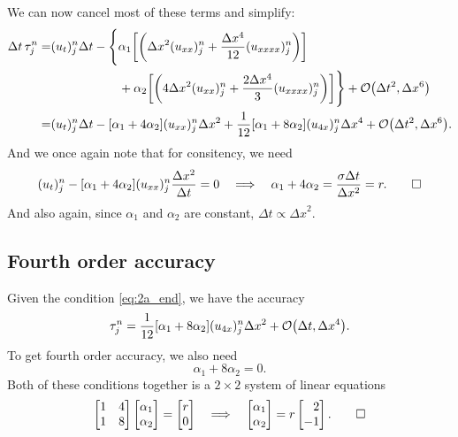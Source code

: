 \documentclass[11pt,letter, swedish, english
]{article}
\newcommand{\Dx}{\ensuremath{\Delta{x}}}
\newcommand{\Dt}{\ensuremath{\Delta{t}}}
\begin{document}
We can now cancel most of these terms and simplify:
\begin{equation}
\begin{aligned}
\Dt\,\tau_j^n=& (u_t)_j^n\Dt
-\Bigg\{\alpha_1\qty[
\qty(\Dx^2(u_{xx})_j^n+\frac{\Dx^4}{12}(u_{xxxx})_j^n)]
\\ &\hspace{55pt}
+\alpha_2\qty[
\qty(4\Dx^2(u_{xx})_j^n+\frac{2\Dx^4}{3}(u_{xxxx})_j^n)]
\Bigg\} +\order{\Dt^2, \Dx^6}\\
=& (u_t)_j^n\Dt-[\alpha_1+4\alpha_2](u_{xx})_j^n\Dx^2
+\frac{1}{12}[\alpha_1+8\alpha_2](u_{4x})_j^n\Dx^4
+\order{\Dt^2, \Dx^6}.
\end{aligned}
\end{equation}
And we once again note that for consitency, we need 
\begin{equation}\label{eq:2a_end}
(u_t)_j^n-[\alpha_1+4\alpha_2](u_{xx})_j^n\frac{\Dx^2}{\Dt}=0
\quad\Longrightarrow\quad
\alpha_1+4\alpha_2=\frac{\sigma\Dt}{\Dx^2}=r.
\qed
\end{equation}
And also again, since $\alpha_1$ and $\alpha_2$ are constant,
$\Dt\propto\Dx^2$. 

\subsection{Fourth order accuracy}
Given the condition \eqref{eq:2a_end}, we have the accuracy
\begin{equation}
\tau_j^n=\frac{1}{12}[\alpha_1+8\alpha_2](u_{4x})_j^n\Dx^2
+\order{\Dt, \Dx^4}.
\end{equation}
To get fourth order accuracy, we also need
\begin{equation}
\alpha_1+8\alpha_2=0.
\end{equation}
Both of these conditions together is a $2\times2$ system of linear
equations 
\begin{equation}
\begin{bmatrix}1&4\\1&8\end{bmatrix}
\begin{bmatrix}\alpha_1\\\alpha_2\end{bmatrix}
=\begin{bmatrix}r\\0\end{bmatrix}
\quad\Longrightarrow\quad
\begin{bmatrix}\alpha_1\\\alpha_2\end{bmatrix}
=r\begin{bmatrix*}[r]
2\\-1
\end{bmatrix*}.
\qed
\end{equation}
\end{document}
